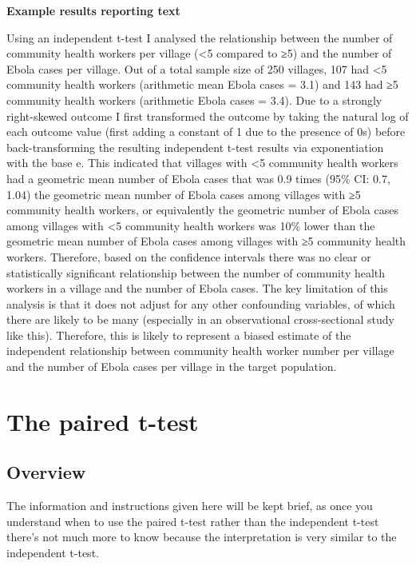 \documentclass[
]{book}
\begin{document}
\textbf{Example results reporting text}

Using an independent t-test I analysed the relationship between the number of community health workers per village (\textless5 compared to ≥5) and the number of Ebola cases per village. Out of a total sample size of 250 villages, 107 had \textless5 community health workers (arithmetic mean Ebola cases = 3.1) and 143 had ≥5 community health workers (arithmetic Ebola cases = 3.4). Due to a strongly right-skewed outcome I first transformed the outcome by taking the natural log of each outcome value (first adding a constant of 1 due to the presence of 0s) before back-transforming the resulting independent t-test results via exponentiation with the base e. This indicated that villages with \textless5 community health workers had a geometric mean number of Ebola cases that was 0.9 times (95\% CI: 0.7, 1.04) the geometric mean number of Ebola cases among villages with ≥5 community health workers, or equivalently the geometric number of Ebola cases among villages with \textless5 community health workers was 10\% lower than the geometric mean number of Ebola cases among villages with ≥5 community health workers. Therefore, based on the confidence intervals there was no clear or statistically significant relationship between the number of community health workers in a village and the number of Ebola cases. The key limitation of this analysis is that it does not adjust for any other confounding variables, of which there are likely to be many (especially in an observational cross-sectional study like this). Therefore, this is likely to represent a biased estimate of the independent relationship between community health worker number per village and the number of Ebola cases per village in the target population.

\hypertarget{the-paired-t-test}{%
\chapter{The paired t-test}\label{the-paired-t-test}}

\hypertarget{overview-12}{%
\section{Overview}\label{overview-12}}

The information and instructions given here will be kept brief, as once you understand when to use the paired t-test rather than the independent t-test there's not much more to know because the interpretation is very similar to the independent t-test.
\end{document}
